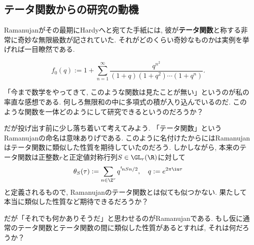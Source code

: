 \documentclass[11pt,b5paper,oneside,lualatex]{ltjsarticle} %
\numberwithin{equation}{section} %
\begin{document}
\subsection{テータ関数からの研究の動機} \label{subsec:mock}


Ramanujanがその最期にHardyへと宛てた手紙には, 彼が\textbf{テータ関数}と称する非常に奇妙な無限級数が記されていた. 
それがどのくらい奇妙なものかは実例を挙げれば一目瞭然である. 

\begin{dfn}
	\[
	f_0(q) :=
	1 + \sum_{n=1}^{\infty} \frac{q^{n^2}}{(1+q)(1+q^2) \cdots (1+q^n)}.
	\]
\end{dfn}

%

「今まで数学をやってきて, このような関数は見たことが無い」というのが私の率直な感想である. 
何しろ無限和の中に多項式の積が入り込んでいるのだ. 
このような関数を一体どのようにして研究できるというのだろうか？

だが投げ出す前に少し落ち着いて考えてみよう. 
「テータ関数」というRamanujanの命名は意味ありげである. 
このように名付けたからにはRamanujanはテータ関数に類似した性質を期待していたのだろう. 
しかしながら, 本来のテータ関数は正整数$ r $と正定値対称行列$ S \in \GL_r(\R) $に対して
\[
\theta_S (\tau) :=
\sum_{n \in \Z^r} q^{{}^t\!n S n/2}, \quad
q := e^{2\pi\iu\tau}
\]
と定義されるもので, Ramanujanのテータ関数とは似ても似つかない. 
果たして本当に類似した性質など期待できるだろうか？

だが「それでも何かありそうだ」と思わせるのがRamanujanである. 
もし仮に通常のテータ関数とテータ関数の間に類似した性質があるとすれば, それは何だろうか？
\end{document}
